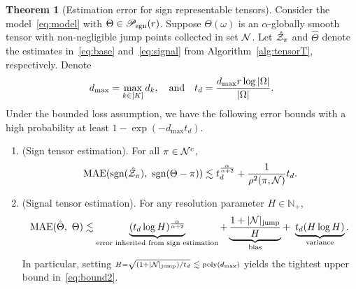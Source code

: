 \documentclass[twoside,11pt]{article}
\theoremstyle{definition}
\newtheorem{thm}{Theorem}
\newcommand*{\KeepStyleUnderBrace}[1]{%
  \mathop{%
    \mathchoice
    {\underbrace{\displaystyle#1}}%
    {\underbrace{\textstyle#1}}%
    {\underbrace{\scriptstyle#1}}%
    {\underbrace{\scriptscriptstyle#1}}%
  }\limits
}
\def\sign{\textup{sgn}}
\def\caliP{\mathscr{P}_{\textup{sgn}}}
\begin{document}
\begin{thm}[Estimation error for sign representable tensors]\label{thm:estimation} Consider the model~\eqref{eq:model} with $\Theta\in\caliP(r)$. Suppose $\Theta(\omega)$ is an $\alpha$-globally smooth tensor with non-negligible jump points collected in set $\mathcal{N}$. Let $\hat {\mathcal{Z}}_\pi$ and $\hat \Theta$ denote the estimates in~\eqref{eq:base} and~\eqref{eq:signal} from Algorithm~\ref{alg:tensorT}, respectively. Denote 
\[ 
d_{\max}=\max_{k\in[K]}d_k,\quad \text{and}\quad t_d = {d_{\max}r\log|\Omega|\over |\Omega|}.
\]
Under the bounded loss assumption, we have the following error bounds with a high probability at least $1-\exp(-d_{\max}t_d)$.
\begin{enumerate}[label=(\alph*)]
\item (Sign tensor estimation). For all $\pi\in\mathcal{N}^c$,
\begin{equation}\label{eq:bound}
\textup{MAE}(\sign(\hat \tZ_\pi),\ \sign(\Theta-\pi)) \lesssim t_d^{\alpha\over \alpha+2}+{1\over \rho^2(\pi,\tN)}t_d.
\end{equation}
\item (Signal tensor estimation). For any resolution parameter $H\in\mathbb{N}_{+}$,
\begin{equation}\label{eq:bound2}
\textup{MAE}(\hat \Theta,\ \Theta)\lesssim \KeepStyleUnderBrace{(t_d\log H)^{\alpha\over \alpha+2}}_{\text{error inherited from sign estimation}}+\KeepStyleUnderBrace{{1+|\tN|_{\text{jump}}\over H}}_{\text{bias}}+\ \KeepStyleUnderBrace{{t_d(H\log H)}}_{\text{variance}}.
\end{equation}
In particular, setting $\scriptstyle  H=\sqrt{(1+|\mathcal{N}|_{\text{jump}})/t_d}\ \lesssim \text{ poly}(d_{\max})$ yields the tightest upper bound in~\eqref{eq:bound2}.
\end{enumerate}
\end{thm}


\end{document}
